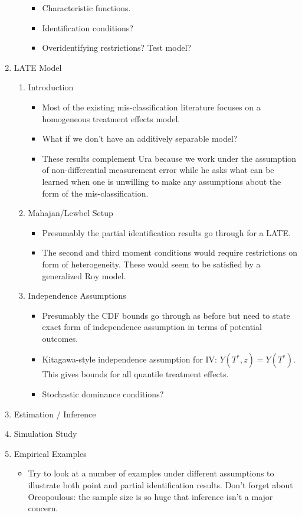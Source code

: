 \documentclass[12pt]{article}
\begin{document}
\begin{enumerate}
\begin{enumerate}
\begin{itemize}
          \item Characteristic functions.
          \item Identification conditions?
          \item Overidentifying restrictions? Test model?
        \end{itemize}
    \end{enumerate}
  \item LATE Model
    \begin{enumerate}
      \item Introduction
        \begin{itemize}
          \item Most of the existing mis-classification literature focuses on a homogeneous treatment effects model.
          \item What if we don't have an additively separable model?
          \item These results complement Ura because we work under the assumption of non-differential measurement error while he asks what can be learned when one is unwilling to make any assumptions about the form of the mis-classification.
        \end{itemize}
      \item Mahajan/Lewbel Setup
        \begin{itemize}
          \item Presumably the partial identification results go through for a LATE.
          \item The second and third moment conditions would require restrictions on form of heterogeneity.
            These would seem to be satisfied by a generalized Roy model.
        \end{itemize}
      \item Independence Assumptions
        \begin{itemize}
          \item Presumably the CDF bounds go through as before but need to state exact form of independence assumption in terms of potential outcomes.
          \item Kitagawa-style independence assumption for IV: $Y(T^*,z) = Y(T^*)$. This gives bounds for all quantile treatment effects.
          \item Stochastic dominance conditions?
        \end{itemize}
    \end{enumerate}
  \item Estimation / Inference
  \item Simulation Study
  \item Empirical Examples
    \begin{itemize}
      \item Try to look at a number of examples under different assumptions to illustrate both point and partial identification results. Don't forget about Oreopoulous: the sample size is so huge that inference isn't a major concern.
    \end{itemize}
\end{enumerate}
\end{document}
